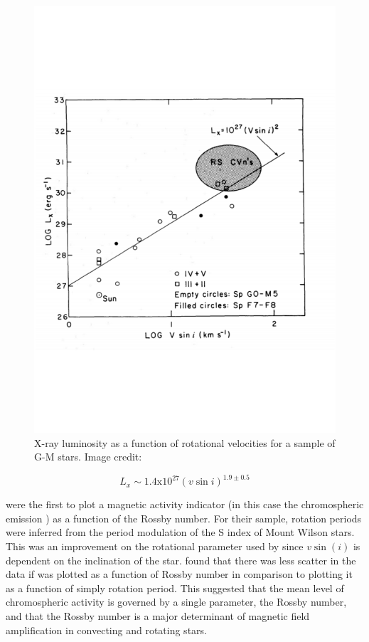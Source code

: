 \begin{figure}
    \centering
    \includegraphics[scale=0.5]{Figures/2-Historical_overview/p81_fig_5.pdf}
    \caption[First plot of magnetic activity as a function of rotational velocity]{X-ray luminosity as a function of rotational velocities for a sample of G-M stars. Image credit: \citet{Pallavicini_etal_1981}}
    \label{fig:pallavicini_etal_1981_plot}
\end{figure}

\begin{equation}
    L_{x} \sim 1.4\text{x}10^{27}(v\sin i)^{1.9 \pm 0.5}
    \label{Eq:pallavicini_81}
\end{equation}

\citet{Noyes_etal_1984} were the first to plot a magnetic activity indicator (in this case the chromospheric emission \Rprime) as a function of the Rossby number. For their sample, rotation periods were inferred from the period modulation of the S index of Mount Wilson stars. This was an improvement on the rotational parameter used by \citet{Pallavicini_etal_1981} since $v\sin(i)$ is dependent on the inclination of the star. \citet{Noyes_etal_1984} found that there was less scatter in the data if \Rprime was plotted as a function of Rossby number in comparison to plotting it as a function of simply rotation period. This suggested that the mean level of chromospheric activity is governed by a single parameter, the Rossby number, and that the Rossby number is a major determinant of magnetic field amplification in convecting and rotating stars.

